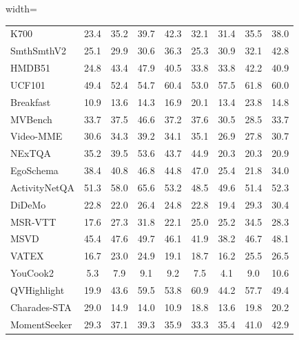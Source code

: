 \begin{table}[!ht]
\begin{adjustbox}{width=\textwidth}
\begin{tabular}{l|cccccccc}
        K700 & 23.4 & 35.2 & 39.7 & 42.3 & 32.1 & 31.4 & 35.5 & 38.0 \\ 
        SmthSmthV2 & 25.1 & 29.9 & 30.6 & 36.3 & 25.3 & 30.9 & 32.1 & 42.8 \\ 
        HMDB51 & 24.8 & 43.4 & 47.9 & 40.5 & 33.8 & 33.8 & 42.2 & 40.9 \\ 
        UCF101 & 49.4 & 52.4 & 54.7 & 60.4 & 53.0 & 57.5 & 61.8 & 60.0 \\ 
        Breakfast & 10.9 & 13.6 & 14.3 & 16.9 & 20.1 & 13.4 & 23.8 & 14.8 \\ 
        MVBench & 33.7 & 37.5 & 46.6 & 37.2 & 37.6 & 30.5 & 28.5 & 33.7 \\ 
        Video-MME & 30.6 & 34.3 & 39.2 & 34.1 & 35.1 & 26.9 & 27.8 & 30.7 \\ 
        NExTQA & 35.2 & 39.5 & 53.6 & 43.7 & 44.9 & 20.3 & 20.3 & 20.9 \\ 
        EgoSchema & 38.4 & 40.8 & 46.8 & 44.8 & 47.0 & 25.4 & 21.8 & 34.0 \\ 
        ActivityNetQA & 51.3 & 58.0 & 65.6 & 53.2 & 48.5 & 49.6 & 51.4 & 52.3 \\ 
        DiDeMo & 22.8 & 22.0 & 26.4 & 24.8 & 22.8 & 19.4 & 29.3 & 30.4 \\ 
        MSR-VTT & 17.6 & 27.3 & 31.8 & 22.1 & 25.0 & 25.2 & 34.5 & 28.3 \\ 
        MSVD & 45.4 & 47.6 & 49.7 & 46.1 & 41.9 & 38.2 & 46.7 & 48.1 \\ 
        VATEX & 16.7 & 23.0 & 24.9 & 19.1 & 18.7 & 16.2 & 25.5 & 26.5 \\ 
        YouCook2 & 5.3 & 7.9 & 9.1 & 9.2 & 7.5 & 4.1 & 9.0 & 10.6 \\ 
        QVHighlight & 19.9 & 43.6 & 59.5 & 53.8 & 60.9 & 44.2 & 57.7 & 49.4 \\ 
        Charades-STA & 29.0 & 14.9 & 14.0 & 10.9 & 18.8 & 13.6 & 19.8 & 20.2 \\ 
        MomentSeeker & 29.3 & 37.1 & 39.3 & 35.9 & 33.3 & 35.4 & 41.0 & 42.9 \\ 
        \midrule
        

\end{tabular}
\end{adjustbox}
\end{table}

